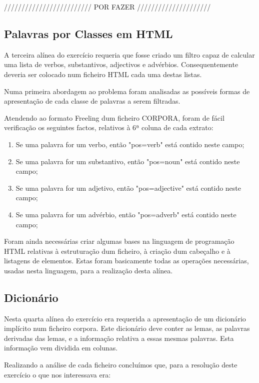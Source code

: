 \documentclass[11pt,a4paper]{report}
\begin{document}
///////////////////////// POR FAZER /////////////////////



\subsection{Palavras por Classes em HTML}

A terceira alínea do exercício requeria que fosse criado um filtro capaz de calcular uma lista de verbos, substantivos, adjectivos e advérbios. Consequentemente deveria ser colocado num ficheiro HTML cada uma destas listas.

Numa primeira abordagem ao problema foram analisadas as possíveis formas de apresentação de cada classe de palavras a serem filtradas.

Atendendo ao formato Freeling dum ficheiro CORPORA, foram de fácil verificação os seguintes factos, relativos à 6ª coluna de cada extrato:

\begin{enumerate}
 \item Se uma palavra for um verbo, então "pos=verb" está contido neste campo;
 \item Se uma palavra for um substantivo, então "pos=noun" está contido neste campo;
 \item Se uma palavra for um adjetivo, então "pos=adjective" está contido neste campo;
 \item Se uma palavra for um advérbio, então "pos=adverb" está contido neste campo;
\end{enumerate}

Foram ainda necessárias criar algumas bases na linguagem de programação HTML relativas à estruturação dum ficheiro, à criação dum cabeçalho e à listagens de elementos. Estas foram basicamente todas as operações necessárias, usadas nesta linguagem, para a realização desta alínea.


\subsection{Dicionário}

Nesta quarta alínea do exercício era requerida a apresentação de um dicionário implícito num ficheiro corpora. Este dicionário deve conter as lemas, as palavras derivadas das lemas, e a informação relativa a essas mesmas palavras. Esta informação vem dividida em colunas.

Realizando a análise de cada ficheiro concluímos que, para a resolução deste exercício o que nos interessava era:
\end{document}
